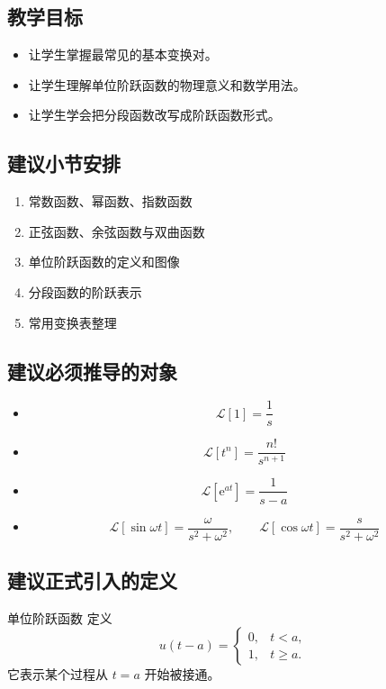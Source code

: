 \subsection*{教学目标}
\begin{itemize}
    \item 让学生掌握最常见的基本变换对。
    \item 让学生理解单位阶跃函数的物理意义和数学用法。
    \item 让学生学会把分段函数改写成阶跃函数形式。
\end{itemize}

\subsection*{建议小节安排}
\begin{enumerate}
    \item 常数函数、幂函数、指数函数
    \item 正弦函数、余弦函数与双曲函数
    \item 单位阶跃函数的定义和图像
    \item 分段函数的阶跃表示
    \item 常用变换表整理
\end{enumerate}

\subsection*{建议必须推导的对象}
\begin{itemize}
    \item
    \[
        \mathcal{L}[1]=\frac{1}{s}
    \]
    \item
    \[
        \mathcal{L}[t^n]=\frac{n!}{s^{n+1}}
    \]
    \item
    \[
        \mathcal{L}[\mathrm{e}^{at}]=\frac{1}{s-a}
    \]
    \item
    \[
        \mathcal{L}[\sin\omega t]=\frac{\omega}{s^2+\omega^2},
        \qquad
        \mathcal{L}[\cos\omega t]=\frac{s}{s^2+\omega^2}
    \]
\end{itemize}

\subsection*{建议正式引入的定义}
\begin{dingliyi}{单位阶跃函数}{}
定义
\[
    u(t-a)=
    \begin{cases}
        0, & t<a,\\
        1, & t\ge a.
    \end{cases}
\]
它表示某个过程从 $t=a$ 开始被接通。
\end{dingliyi}

